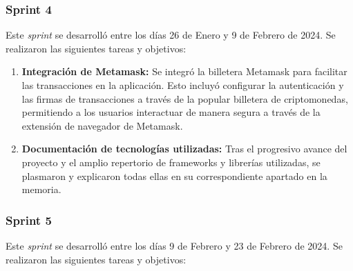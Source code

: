 \subsubsection{Sprint 4}

Este \textit{sprint} se desarrolló entre los días 26 de Enero y 9 de Febrero de 2024. Se realizaron las siguientes tareas y objetivos:

\begin{enumerate}

\item \textbf{Integración de Metamask:} Se integró la billetera Metamask para facilitar las transacciones en la aplicación. Esto incluyó configurar la autenticación y las firmas de transacciones a través de la popular billetera de criptomonedas, permitiendo a los usuarios interactuar de manera segura a través de la extensión de navegador de Metamask.

\item \textbf{Documentación de tecnologías utilizadas:}  Tras el progresivo avance del proyecto y el amplio repertorio de frameworks y librerías utilizadas, se plasmaron y explicaron todas ellas en su correspondiente apartado en la memoria.

\end{enumerate}


\subsubsection{Sprint 5}

Este \textit{sprint} se desarrolló entre los días 9 de Febrero y 23 de Febrero de 2024. Se realizaron las siguientes tareas y objetivos:

